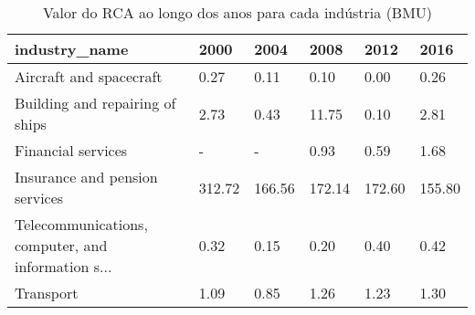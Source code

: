 \begin{table}
\centering
\caption{Valor do RCA ao longo dos anos para cada indústria (BMU)}
\begin{tabular}{p{6cm}p{1.5cm}p{1.5cm}p{1.5cm}p{1.5cm}p{1.5cm}}
\toprule
                                     industry\_name &   2000 &   2004 &   2008 &   2012 &   2016 \\
\midrule
                           Aircraft and spacecraft &   0.27 &   0.11 &   0.10 &   0.00 &   0.26 \\
                   Building and repairing of ships &   2.73 &   0.43 &  11.75 &   0.10 &   2.81 \\
                                Financial services &      - &      - &   0.93 &   0.59 &   1.68 \\
                    Insurance and pension services & 312.72 & 166.56 & 172.14 & 172.60 & 155.80 \\
Telecommunications, computer, and information s... &   0.32 &   0.15 &   0.20 &   0.40 &   0.42 \\
                                         Transport &   1.09 &   0.85 &   1.26 &   1.23 &   1.30 \\
\bottomrule
\end{tabular}
\end{table}
